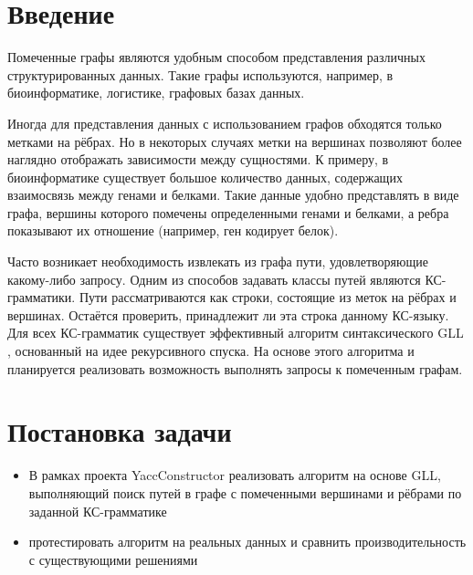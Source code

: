\documentclass[14pt]{matmex-diploma}
\begin{document}
\maketitle
\tableofcontents
\section*{Введение}
    Помеченные графы являются удобным способом представления различных структурированных данных. Такие графы используются, например, в биоинформатике, логистике, графовых базах данных.
    
    Иногда для представления данных с использованием графов обходятся только метками на рёбрах. Но в некоторых случаях метки на вершинах позволяют более наглядно отображать зависимости между сущностями. К примеру, в биоинформатике существует большое количество данных, содержащих взаимосвязь между генами и белками. Такие данные удобно представлять в виде графа, вершины которого помечены определенными генами и белками, а ребра показывают их отношение (например, ген кодирует белок).
     
     Часто возникает необходимость извлекать из графа пути, удовлетворяющие какому-либо запросу. Одним из способов задавать классы путей являются КС-грамматики. Пути рассматриваются как строки, состоящие из меток на рёбрах и вершинах. Остаётся проверить, принадлежит ли эта строка данному КС-языку. Для всех КС-грамматик существует эффективный алгоритм синтаксического GLL \cite{gll}, основанный на идее рекурсивного спуска. На основе этого алгоритма и планируется реализовать возможность выполнять запросы к помеченным графам.

\section{Постановка задачи}
\begin{itemize}
    \item В рамках проекта YaccConstructor \cite{YaccConstructorPage} реализовать алгоритм на основе GLL, выполняющий поиск путей в графе с помеченными вершинами и рёбрами по заданной КС-грамматике
    \item протестировать алгоритм на реальных данных и сравнить производительность с существующими решениями
\end{itemize}
\end{document}
